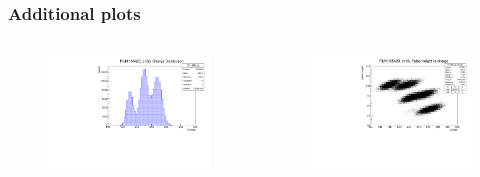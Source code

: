 \documentclass{beamer}
\begin{document}
\begin{frame}
    \frametitle{Additional plots}
    \vspace{-2mm}
    \begin{columns}
        \begin{column}{0.5\textwidth}
    \begin{figure}[!h]
        \centering
        \includegraphics[width =0.9\columnwidth]{figures/pdf/charge.pdf}
        \label{fig:anglesinmuon}
    \end{figure}
\end{column}
\begin{column}{0.5\textwidth}
    \begin{figure}[!h]
        \centering
        \includegraphics[width =0.9\columnwidth]{figures/pdf/phch1.pdf}
        \label{fig:anglesinmuon}
    \end{figure}
\end{column}
\end{columns}

\end{frame}
\end{document}
